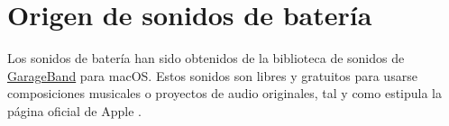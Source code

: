 
    \section{Origen de sonidos de batería} %
    \label{sec:OrigenDeSonidosDeBateria}

        Los sonidos de batería han sido obtenidos de la biblioteca de sonidos de
        \href{https://www.apple.com/es/mac/garageband/}{GarageBand} para macOS. Estos sonidos son libres y gratuitos
        para usarse composiciones musicales o proyectos de audio originales, tal y como estipula la página oficial de
        Apple \cite{support_garageband}.



\newpage
